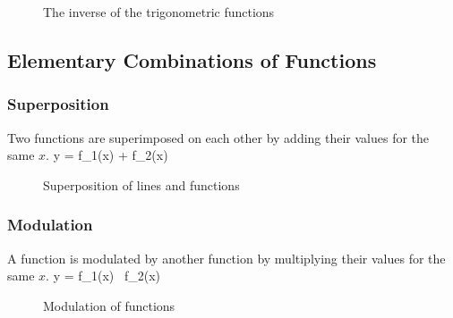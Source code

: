 \begin{figure}[!h]
    \centering
    \hspace*{0.5cm}
     \svs
    \caption{The inverse of the trigonometric functions}
\end{figure}

\subsection{Elementary Combinations of Functions}
\subsubsection{Superposition}
Two functions are superimposed on each other by adding their values for the same $x$.
\bnn y = f_1(x) + f_2(x) \enn
\vspace*{-.5cm} \begin{figure}[!h]
    \centering
    \hspace{0.5cm}
     \svs
    \caption{Superposition of lines and functions} \label{fig17}
\end{figure}

\subsubsection{Modulation}
A function is modulated by another function by multiplying their values for the same $x$. 
\bnn y = f_1(x) \, f_2(x) \enn

\vs\begin{figure}[!h]
    \centering
    \hspace{0.5cm}
      \svs
    \caption{Modulation of functions} \label{fig19}
\end{figure}
